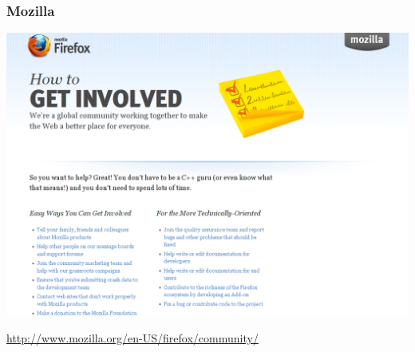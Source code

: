 \documentclass{beamer}
\begin{document}
\begin{frame}
  \frametitle{Mozilla}
  \begin{center} 
    \includegraphics[height=0.8\textheight]{../img/mozilla-get-involved}

    \href{http://www.mozilla.org/en-US/firefox/community/}{http://www.mozilla.org/en-US/firefox/community/}
  \end{center}
\end{frame}
\end{document}
